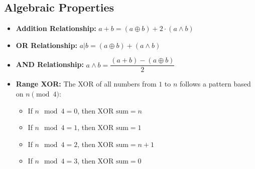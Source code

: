 \subsection{Algebraic Properties}

\begin{itemize}
    \item \textbf{Addition Relationship: } $a + b = (a \oplus b) + 2 \cdot (a \land b)$
    \item \textbf{OR Relationship: }$a | b = (a \oplus b) + (a \land b)$
    \item \textbf{AND Relationship: }$a \land b = \dfrac{(a + b) - (a \oplus b)}{2}$
    \item \textbf{Range XOR: } The XOR of all numbers from $1$ to $n$ follows a pattern based on $n \pmod 4$:
          \begin{itemize}
              \item If $n \mod 4 = 0$, then $\text{XOR sum} = n$
              \item If $n \mod 4 = 1$, then $\text{XOR sum} = 1$
              \item If $n \mod 4 = 2$, then $\text{XOR sum} = n + 1$
              \item If $n \mod 4 = 3$, then $\text{XOR sum} = 0$
          \end{itemize}
\end{itemize}
